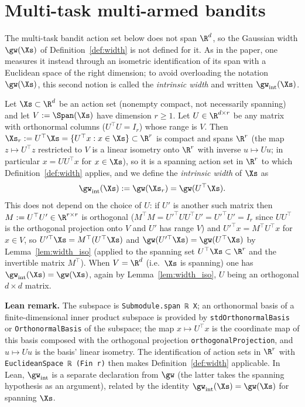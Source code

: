 \section{Multi-task multi-armed bandits}
\label{sec:width_multitask}

The multi-task bandit action set below does not span $\R^d$, so the Gaussian width
$\gw(\Xs)$ of Definition~\ref{def:width} is not defined for it. As in the paper, one
measures it instead through an isometric identification of its span with a Euclidean space
of the right dimension; to avoid overloading the notation $\gw(\Xs)$, this second notion is
called the \emph{intrinsic width} and written $\gw_{\mathrm{int}}(\Xs)$.

\begin{definition}\label{def:width_subspace}
\leanok
{}
Let $\Xs \subset \R^d$ be an action set (nonempty compact, not necessarily spanning) and let
$V := \Span(\Xs)$ have dimension $r \ge 1$. Let
$U \in \R^{d\times r}$ be any matrix with orthonormal columns ($U^\top U = I_r$) whose range
is $V$. Then $\Xs_r := U^\top\Xs = \{U^\top x : x\in\Xs\} \subset \R^r$ is compact and spans
$\R^r$ (the map $z \mapsto U^\top z$ restricted to $V$ is a linear isometry onto $\R^r$ with
inverse $u \mapsto Uu$; in particular $x = UU^\top x$ for $x \in \Xs$), so it is a spanning
action set in $\R^r$ to which Definition~\ref{def:width} applies, and we define the
\emph{intrinsic width} of $\Xs$ as
\[
  \gw_{\mathrm{int}}(\Xs) := \gw(\Xs_r) = \gw(U^\top \Xs).
\]
This does not depend on the choice of $U$: if $U'$ is another such matrix then
$M := U^\top U' \in \R^{r\times r}$ is orthogonal ($M^\top M = U'^\top UU^\top U' = U'^\top U' = I_r$
since $UU^\top$ is the orthogonal projection onto $V$ and $U'$ has range $V$) and
$U'^\top x = M^\top U^\top x$ for $x \in V$, so $U'^\top\Xs = M^\top(U^\top\Xs)$ and
$\gw(U'^\top\Xs) = \gw(U^\top\Xs)$ by Lemma~\ref{lem:width_iso} (applied to the spanning set
$U^\top\Xs \subset \R^r$ and the invertible matrix $M^\top$). When $V = \R^d$ (i.e.\ $\Xs$ is
spanning) one has $\gw_{\mathrm{int}}(\Xs) = \gw(\Xs)$, again by Lemma~\ref{lem:width_iso},
$U$ being an orthogonal $d\times d$ matrix.
\end{definition}

\textbf{Lean remark.} The subspace is \texttt{Submodule.span ℝ X}; an orthonormal basis of a
finite-dimensional inner product subspace is provided by \texttt{stdOrthonormalBasis} or
\texttt{OrthonormalBasis} of the subspace; the map $x \mapsto U^\top x$ is the coordinate map
of this basis composed with the orthogonal projection \texttt{orthogonalProjection}, and
$u \mapsto Uu$ is the basis' linear isometry. The identification of action sets in $\R^r$
with \texttt{EuclideanSpace ℝ (Fin r)} then makes Definition~\ref{def:width} applicable.
In Lean, $\gw_{\mathrm{int}}$ is a separate declaration from $\gw$ (the latter takes the
spanning hypothesis as an argument), related by the identity
$\gw_{\mathrm{int}}(\Xs) = \gw(\Xs)$ for spanning $\Xs$.


